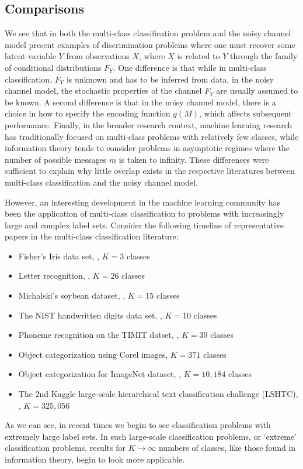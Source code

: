 \subsection{Comparisons}

We see that in both the multi-class classification problem and the
noisy channel model present examples of discrimination problems where
one must recover some latent variable $Y$ from observations $X$, where
$X$ is related to $Y$ through the family of conditional distributions
$F_Y$.  One difference is that while in multi-class classification,
$F_Y$ is unknown and has to be inferred from data, in the noisy
channel model, the stochastic properties of the channel $F_Y$ are
usually assumed to be known.  A second difference is that in the noisy
channel model, there is a choice in how to specify the encoding
function $g(M)$, which affects subsequent performance.  Finally, in
the broader research context, machine learning research has
traditionally focused on multi-class problems with relatively few
classes, while information theory tends to consider problems in
asymptotic regimes where the number of possible messages $m$ is taken
to infinity. These differences were sufficient to explain why little
overlap exists in the respective literatures between multi-class
classification and the noisy channel model.


However, an interesting development in the machine learning community
has been the application of multi-class classification to problems
with increasingly large and complex label sets.  Consider the
following timeline of representative papers in the multi-class
classification literature:
\begin{itemize}
\item Fisher's Iris data set, \cite{fisher1936use}, $K = 3$ classes
\item Letter recognition, \cite{frey1991letter}, $K = 26$ classes
\item Michalski's soybean dataset, \cite{mickalstd1980learning}, $K = 15$ classes
\item The NIST handwritten digits data set, \cite{grother1995nist}, $K = 10$ classes
\item Phoneme recognition on the TIMIT datset, \cite{clarkson1999use}, $K = 39$ classes
\item Object categorization using Corel images, \cite{duygulu2002object} $K = 371$ classes
\item Object categorization for ImageNet dataset, \cite{deng2010does}, $K = 10,184$ classes
\item The 2nd Kaggle large-scale hierarchical text classification challenge (LSHTC), \cite{partalas2015lshtc}, $K = 325,056$
\end{itemize}
As we can see, in recent times we begin to see classification problems
with extremely large label sets.  In such large-scale classification
problems, or `extreme' classification problems, results for $K \to
\infty$ numbers of classes, like those found in information theory,
begin to look more applicable.

